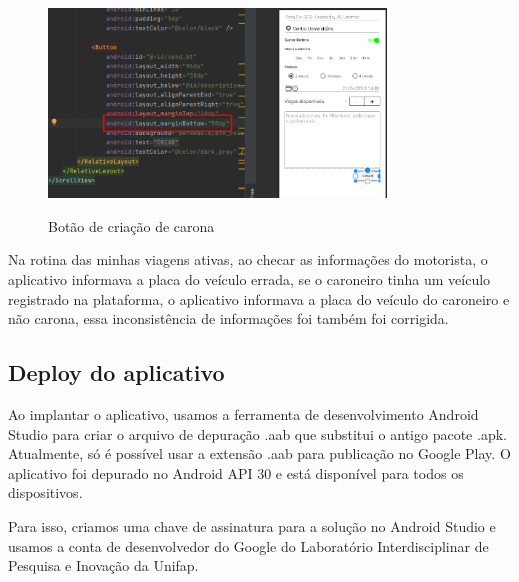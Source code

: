 \begin{figure}[H]
	\centering
	\caption{Botão de criação de carona}
	\includegraphics[width=0.8\textwidth]{./04-figuras/desenvolvimento/manutencao/man_botao_criacao_carona.png}
	\label{fig:botão_de_criacao_de_carona}
\end{figure}

Na rotina das minhas viagens ativas, ao checar as informações do motorista, o aplicativo informava a placa do veículo errada, se o caroneiro tinha um veículo registrado na plataforma, o aplicativo informava a placa do veículo do caroneiro e não carona, essa inconsistência de informações foi também foi corrigida.

\subsection{Deploy do aplicativo}
Ao implantar o aplicativo, usamos a ferramenta de desenvolvimento Android Studio para criar o arquivo de depuração .aab que substitui o antigo pacote .apk. Atualmente, só é possível usar a extensão .aab para publicação no Google Play. O aplicativo foi depurado no Android API 30 e está disponível para todos os dispositivos.

Para isso, criamos uma chave de assinatura para a solução no Android Studio e usamos a conta de desenvolvedor do Google do Laboratório Interdisciplinar de Pesquisa e Inovação da Unifap.

